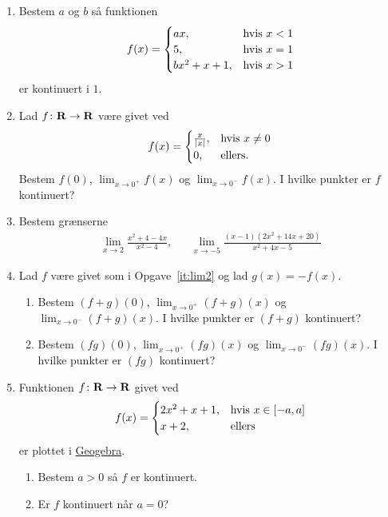 \begin{enumerate}
	
	\item Bestem $a$ og $b$ så funktionen
	\begin{align*}
	f(x)=\begin{cases}
	ax,&\textup{hvis } x<1\\
	5,&\textup{hvis } x=1\\
	bx^2+x+1,& \textup{hvis }x>1
	\end{cases}
	\end{align*}
	er kontinuert i $1$.
	
	\item\label{it:lim2} Lad $f\colon \mathbf{R}\to \mathbf{R}$ være givet ved
	\begin{align*}
	f(x)=\begin{cases}
	\frac{x}{\vert x\vert},&\textup{hvis } x\neq 0\\
	0 ,& \textup{ellers}.
	\end{cases}
	\end{align*}
	Bestem $ f(0) $, $ \lim_{x\to 0^+}f(x) $ og $\lim_{x\to 0^-}f(x)$. I hvilke punkter er $f$ kontinuert?
	
	\item Bestem grænserne
	\begin{align*}
	\lim_{x\to 2} \frac{x^2+4-4x}{x^2-4},&& \lim_{x\to -5} \frac{(x-1)(2x^2+14x+20)}{x^2+4x-5}
	\end{align*}
	
	\item Lad $f$ være givet som i Opgave~\ref{it:lim2} og lad $g(x)=-f(x)$. 
	\begin{enumerate}
		\item Bestem $ (f+g)(0) $, $ \lim_{x\to 0^+}(f+g)(x) $ og $\lim_{x\to 0^-}(f+g)(x)$. I hvilke punkter er $(f+g)$ kontinuert?
		\item Bestem $ (fg)(0) $, $ \lim_{x\to 0^+}(fg)(x) $ og $\lim_{x\to 0^-}(fg)(x)$. I hvilke punkter er $(fg)$ kontinuert?
	\end{enumerate}
	
	\item Funktionen $f\colon \mathbf{R}\to \mathbf{R}$ givet ved 
	\begin{align*}
	f(x)=\begin{cases}
	2x^2+x+1,&\textup{hvis } x\in [-a,a]\\
	x+2,&\textup{ellers}
	\end{cases}
	\end{align*}
	er plottet i \href{https://www.geogebra.org/m/mAmaHPC6}{Geogebra}.
	\begin{enumerate}
		\item Bestem $a>0$ så $f$ er kontinuert.
		\item Er $f$ kontinuert når $a=0$?
	\end{enumerate}


\end{enumerate}
